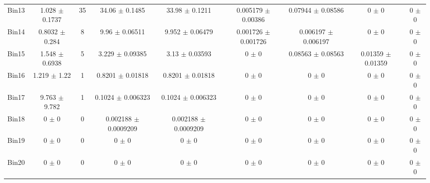 \begin{tabular}{@{\extracolsep{4pt}}lcccccccc@{}}
     Bin13 & 1.028 $\pm$ 0.1737 & 35 & 34.06 $\pm$ 0.1485 & 33.98 $\pm$ 0.1211 & 0.005179 $\pm$ 0.00386 & 0.07944 $\pm$ 0.08586 & 0 $\pm$ 0 & 0 $\pm$ 0 \\ 
     Bin14 & 0.8032 $\pm$ 0.284 & 8 & 9.96 $\pm$ 0.06511 & 9.952 $\pm$ 0.06479 & 0.001726 $\pm$ 0.001726 & 0.006197 $\pm$ 0.006197 & 0 $\pm$ 0 & 0 $\pm$ 0 \\ 
     Bin15 & 1.548 $\pm$ 0.6938 & 5 & 3.229 $\pm$ 0.09385 & 3.13 $\pm$ 0.03593 & 0 $\pm$ 0 & 0.08563 $\pm$ 0.08563 & 0.01359 $\pm$ 0.01359 & 0 $\pm$ 0 \\ 
     Bin16 & 1.219 $\pm$ 1.22 & 1 & 0.8201 $\pm$ 0.01818 & 0.8201 $\pm$ 0.01818 & 0 $\pm$ 0 & 0 $\pm$ 0 & 0 $\pm$ 0 & 0 $\pm$ 0 \\ 
     Bin17 & 9.763 $\pm$ 9.782 & 1 & 0.1024 $\pm$ 0.006323 & 0.1024 $\pm$ 0.006323 & 0 $\pm$ 0 & 0 $\pm$ 0 & 0 $\pm$ 0 & 0 $\pm$ 0 \\ 
     Bin18 & 0 $\pm$ 0 & 0 & 0.002188 $\pm$ 0.0009209 & 0.002188 $\pm$ 0.0009209 & 0 $\pm$ 0 & 0 $\pm$ 0 & 0 $\pm$ 0 & 0 $\pm$ 0 \\ 
     Bin19 & 0 $\pm$ 0 & 0 & 0 $\pm$ 0 & 0 $\pm$ 0 & 0 $\pm$ 0 & 0 $\pm$ 0 & 0 $\pm$ 0 & 0 $\pm$ 0 \\ 
     Bin20 & 0 $\pm$ 0 & 0 & 0 $\pm$ 0 & 0 $\pm$ 0 & 0 $\pm$ 0 & 0 $\pm$ 0 & 0 $\pm$ 0 & 0 $\pm$ 0 \\ 
\hline\hline
  \end{tabular}
